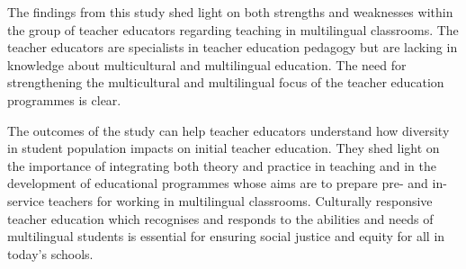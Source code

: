 \documentclass[output=paper]{langscibook}
\begin{document}
The findings from this study shed light on both strengths and weaknesses within the group of teacher educators regarding teaching in multilingual classrooms. The teacher educators are specialists in teacher education pedagogy but are lacking in knowledge about multicultural and multilingual education{. The need for strengthening the multicultural and multilingual focus of the teacher education programmes is clear.}

{The outcomes of the study can help teacher educators understand how diversity in student population impacts on initial teacher education. They shed light on the importance of integrating both theory and practice in teaching and in the development of educational programmes whose aims are to prepare pre- and in-service teachers for working in multilingual classrooms. Culturally responsive teacher education which recognises and responds to the abilities and needs of multilingual students is essential for ensuring social justice and equity for all in today’s schools.}

\sloppy\printbibliography[heading=subbibliography,notkeyword=this]
\end{document}
